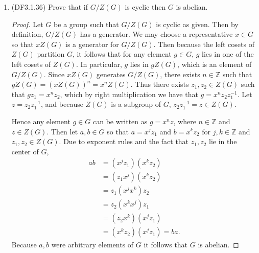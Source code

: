 \documentclass[11pt]{article}
\newcommand{\cbr}[1]{\left\{#1\right\}}
\begin{document}
\begin{enumerate}
\begin{proof}
        It is also true that $\varphi$ is injective. Let $\varphi(\sigma) = \sigma\tau^a = \pi\tau^b = \varphi(\pi)$, for $a,b\in\cbr{0,1}$. We reach a contradiction when $a\neq b$, because $\sigma$ and $\tau$ were permutations in $S_{n-2}$, so they fix $n$ and $n-1$. It is not possible to write $\sigma = \pi\tau$ or $\pi = \sigma\tau$ as a result. Therefore, $a = b$, and by right cancellation $\sigma = \pi$. Hence $\varphi$ is an injective homomorphism, which means $\ker{\varphi}$ is the trivial subgroup. Then by the First Isomorphism Theorem, \[\frac{S_{n-2}}{\ker{\varphi}} = \frac{S_{n-2}}{\cbr{1}} \cong S_{n-2}\cong \varphi(S_{n-2})\leq A_n.\]
        Hence for all $n\geq 3$, $A_n$ contains a subgroup isomorphic to $S_{n-2}$.
    \end{proof}
    \item (DF3.1.36) Prove that if $G/Z(G)$ is cyclic then $G$ is abelian. 
    \begin{proof}
      Let $G$ be a group such that $G/Z(G)$ is cyclic as given. Then by definition, $G/Z(G)$ has a generator. We may choose a representative $x\in G$ so that $xZ(G)$ is a generator for $G/Z(G)$. Then because the left cosets of $Z(G)$ partition $G$, it follows that for any element $g\in G$, $g$ lies in one of the left cosets of $Z(G)$. In particular, $g$ lies in $gZ(G)$, which is an element of $G/Z(G)$. Since $xZ(G)$ generates $G/Z(G)$, there exists $n\in \mathbb{Z}$ such that $gZ(G) = (xZ(G))^n = x^nZ(G)$. Thus there exists $z_1,z_2\in Z(G)$ such that $gz_1 = x^nz_2$, which by right multiplication we have that $g = x^nz_2z_1^{-1}$. Let $z = z_2z_1^{-1}$, and because $Z(G)$ is a subgroup of $G$, $z_2z_1^{-1}=z\in Z(G)$. 

      Hence any element $g\in G$ can be written as $g = x^nz$, where $n\in \mathbb{Z}$ and $z\in Z(G)$. Then let $a,b\in G$ so that $a = x^jz_1$ and $b = x^kz_2$ for $j,k\in \mathbb{Z}$ and $z_1,z_2\in Z(G)$. Due to exponent rules and the fact that $z_1,z_2$ lie in the center of $G$, \begin{align*}
        ab &= (x^jz_1)(x^kz_2)\\
        &= (z_1x^j)(x^kz_2) \\
        &= z_1(x^jx^k)z_2 \\
        &= z_2(x^kx^j)z_1 \\
        &= (z_2x^k)(x^jz_1) \\
        &= (x^kz_2)(x^jz_1) = ba.
      \end{align*} Because $a,b$ were arbitrary elements of $G$ it follows that $G$ is abelian.
    \end{proof}
\end{enumerate}
\end{document}
